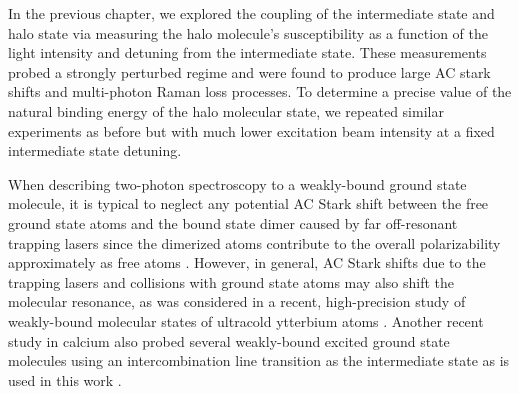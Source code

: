 
In the previous chapter, we explored the coupling of the intermediate state and halo state via measuring the halo molecule's susceptibility as a function of the light intensity and detuning from the intermediate state.
These measurements probed a strongly perturbed regime and were found to produce large AC stark shifts and multi-photon Raman loss processes. 
To determine a precise value of the natural binding energy of the halo molecular state, we repeated similar experiments as before but with much lower excitation beam intensity at a fixed intermediate state detuning.

When describing two-photon spectroscopy to a weakly-bound ground state molecule, it is typical to neglect any potential AC Stark shift between the free ground state atoms and the bound state dimer caused by far off-resonant trapping lasers since the dimerized atoms contribute to the overall polarizability approximately as free atoms \cite{Jones2006}.
However, in general, AC Stark shifts due to the trapping lasers and collisions with ground state atoms may also shift the molecular resonance, as was considered in a recent, high-precision study of weakly-bound molecular states of ultracold ytterbium atoms \cite{bbc17}.
Another recent study in calcium also probed several weakly-bound excited ground state molecules using an intercombination line transition as the intermediate state as is used in this work \cite{Pachomow2017a}.

